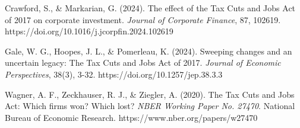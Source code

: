 \documentclass[11pt]{article}
\begin{document}
\newpage
\begin{thebibliography}{99}



Crawford, S., \& Markarian, G. (2024). The effect of the Tax Cuts and Jobs Act of 2017 on corporate investment. \textit{Journal of Corporate Finance}, 87, 102619. https://doi.org/10.1016/j.jcorpfin.2024.102619 \label{crawford}

Gale, W. G., Hoopes, J. L., \& Pomerleau, K. (2024). Sweeping changes and an uncertain legacy: The Tax Cuts and Jobs Act of 2017. \textit{Journal of Economic Perspectives}, 38(3), 3-32. https://doi.org/10.1257/jep.38.3.3 \label{gale}

Wagner, A. F., Zeckhauser, R. J., \& Ziegler, A. (2020). The Tax Cuts and Jobs Act: Which firms won? Which lost? \textit{NBER Working Paper No. 27470}. National Bureau of Economic Research. https://www.nber.org/papers/w27470  \label{wagner}



\end{thebibliography}
\end{document}

